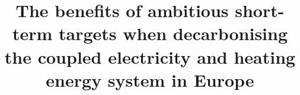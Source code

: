 \documentclass[5p]{elsarticle} %
\begin{document}
\begin{frontmatter}

\title{The benefits of ambitious short-term targets when decarbonising the coupled electricity and heating energy system in Europe}




\begin{abstract}



\end{abstract}

\begin{keyword}


\end{keyword}

\end{frontmatter}

\end{document}
